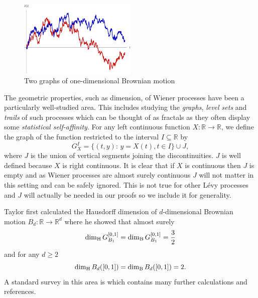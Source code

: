\begin{figure}[h]
    \centering
	\includegraphics[width=0.5\textwidth]{pics/ch-brownian/wiener_process.pdf}
	\caption{\label{fig:brownianmotion}Two graphs of one-dimensional Brownian motion}
\end{figure}

The geometric properties, such as dimension, of Wiener processes have been a particularly well-studied area. This includes studying the \emph{graphs}, \emph{level sets} and \emph{trails} of such processes which can be thought of as fractals as they often display some \emph{statistical self-affinity}. For any left continuous function $X:\mathbb{R}\to\mathbb{R}$, we define the graph of the function restricted to the interval $I \subseteq \mathbb{R}$ by
\[
G^{I}_{X}=\{(t,y) \colon \, y=X(t),t\in I\}\cup J,
\]
where $J$ is the union of vertical segments joining the discontinuities. $J$ is well defined because $X$ is right continuous. It is clear that if $X$ is continuous then $J$ is empty and as Wiener processes are almost surely continuous $J$ will not matter in this setting and can be safely ignored. This is not true for other L\'evy processes and $J$ will actually be needed in our proofs so we include it for generality.

Taylor \cite{taylor} first calculated the Hausdorff dimension of $d$-dimensional Brownian motion $B_d:\mathbb{R}\to\mathbb{R}^d$ where he showed that almost surely
\[
\dim_\text{H} G_{B_1}^{[0,1]} = \dim_{\textup{B}}  G_{B_1}^{[0,1]} = \frac{3}{2}         
\]
and for any $d\ge 2$
\[
\dim_\text{H} B_d([0,1]) = \dim_{\textup{B}} B_d([0,1]) =  2.
\]
A standard survey in this area is \cite{taylor-survey} which contains many further calculations and references.


